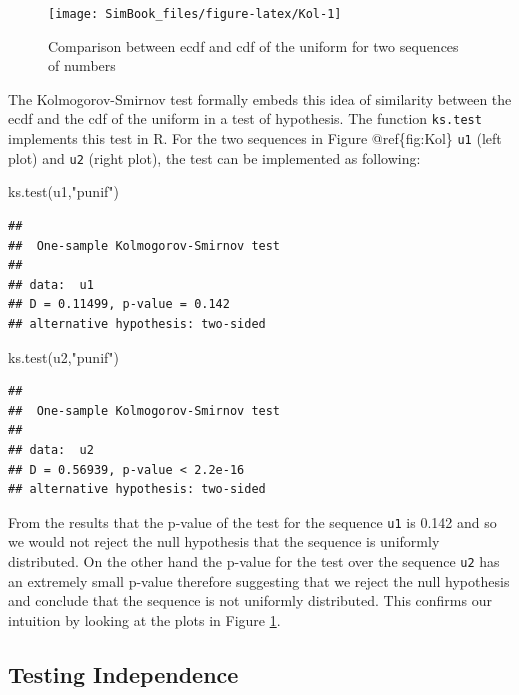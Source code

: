 \documentclass[
]{book}
\newenvironment{Shaded}{\begin{snugshade}}{\end{snugshade}}
\newcommand{\FunctionTok}[1]{\textcolor[rgb]{0.00,0.00,0.00}{#1}}
\newcommand{\NormalTok}[1]{#1}
\newcommand{\StringTok}[1]{\textcolor[rgb]{0.31,0.60,0.02}{#1}}
\begin{document}
\begin{figure}

{\centering \texttt{[image: SimBook\_files/figure-latex/Kol-1]} 

}

\caption{Comparison between ecdf and cdf of the uniform for two sequences of numbers}\label{fig:Kol}
\end{figure}

The Kolmogorov-Smirnov test formally embeds this idea of similarity between the ecdf and the cdf of the uniform in a test of hypothesis. The function \texttt{ks.test} implements this test in R. For the two sequences in Figure @ref\{fig:Kol\} \texttt{u1} (left plot) and \texttt{u2} (right plot), the test can be implemented as following:

\begin{Shaded}
\begin{Highlighting}[]
\FunctionTok{ks.test}\NormalTok{(u1,}\StringTok{"punif"}\NormalTok{)}
\end{Highlighting}
\end{Shaded}

\begin{verbatim}
## 
##  One-sample Kolmogorov-Smirnov test
## 
## data:  u1
## D = 0.11499, p-value = 0.142
## alternative hypothesis: two-sided
\end{verbatim}

\begin{Shaded}
\begin{Highlighting}[]
\FunctionTok{ks.test}\NormalTok{(u2,}\StringTok{"punif"}\NormalTok{)}
\end{Highlighting}
\end{Shaded}

\begin{verbatim}
## 
##  One-sample Kolmogorov-Smirnov test
## 
## data:  u2
## D = 0.56939, p-value < 2.2e-16
## alternative hypothesis: two-sided
\end{verbatim}

From the results that the p-value of the test for the sequence \texttt{u1} is 0.142 and so we would not reject the null hypothesis that the sequence is uniformly distributed. On the other hand the p-value for the test over the sequence \texttt{u2} has an extremely small p-value therefore suggesting that we reject the null hypothesis and conclude that the sequence is not uniformly distributed. This confirms our intuition by looking at the plots in Figure \ref{fig:Kol}.

\hypertarget{testing-independence}{%
\subsection{Testing Independence}\label{testing-independence}}
\end{document}
